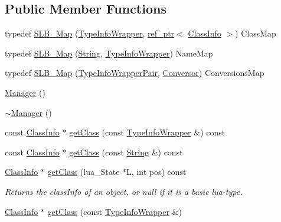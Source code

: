 \subsection*{Public Member Functions}
\begin{DoxyCompactItemize}
\item 
typedef \hyperlink{classSLB_1_1Manager_aaea14f2475937f4c0fa51845b3a10ce3}{S\+L\+B\+\_\+\+Map} (\hyperlink{classSLB_1_1TypeInfoWrapper}{Type\+Info\+Wrapper}, \hyperlink{classSLB_1_1ref__ptr}{ref\+\_\+ptr}$<$ \hyperlink{classSLB_1_1ClassInfo}{Class\+Info} $>$) Class\+Map
\item 
typedef \hyperlink{classSLB_1_1Manager_a98997819973ad26999847b08c975efe1}{S\+L\+B\+\_\+\+Map} (\hyperlink{namespaceSLB_a6a4c36e7004d99c0535c2c91c200c9a1}{String}, \hyperlink{classSLB_1_1TypeInfoWrapper}{Type\+Info\+Wrapper}) Name\+Map
\item 
typedef \hyperlink{classSLB_1_1Manager_ad62b58fdb065f092eb84e6446c830fe3}{S\+L\+B\+\_\+\+Map} (\hyperlink{classSLB_1_1Manager_abd34d2a3a61f567f11744e9b398debd3}{Type\+Info\+Wrapper\+Pair}, \hyperlink{structSLB_1_1Conversor}{Conversor}) Conversions\+Map
\item 
\hyperlink{classSLB_1_1Manager_a1658ff9f18e38ccd9cb8b0b371b9c20b}{Manager} ()
\item 
\hyperlink{classSLB_1_1Manager_a322cad25d7007438b3a043ad02253d29}{$\sim$\+Manager} ()
\item 
const \hyperlink{classSLB_1_1ClassInfo}{Class\+Info} $\ast$ \hyperlink{classSLB_1_1Manager_a84ccfa04b4659837a774e4fd68c8c39a}{get\+Class} (const \hyperlink{classSLB_1_1TypeInfoWrapper}{Type\+Info\+Wrapper} \&) const 
\item 
const \hyperlink{classSLB_1_1ClassInfo}{Class\+Info} $\ast$ \hyperlink{classSLB_1_1Manager_aba315e4277eae45f3aabd4289635ddf3}{get\+Class} (const \hyperlink{namespaceSLB_a6a4c36e7004d99c0535c2c91c200c9a1}{String} \&) const 
\item 
\hyperlink{classSLB_1_1ClassInfo}{Class\+Info} $\ast$ \hyperlink{classSLB_1_1Manager_aaa0f4d0c2046b3e38b09d974f5eb2435}{get\+Class} (lua\+\_\+\+State $\ast$L, int pos) const 
\begin{DoxyCompactList}\small\item\em Returns the class\+Info of an object, or null if it is a basic lua-\/type. \end{DoxyCompactList}\item 
\hyperlink{classSLB_1_1ClassInfo}{Class\+Info} $\ast$ \hyperlink{classSLB_1_1Manager_a47bee0d78050efd3e7b7dc72b6e43dbd}{get\+Class} (const \hyperlink{classSLB_1_1TypeInfoWrapper}{Type\+Info\+Wrapper} \&)

\end{DoxyCompactItemize}
